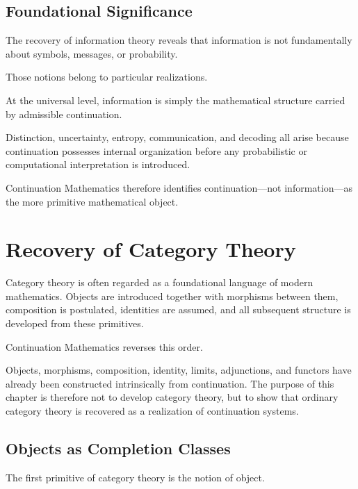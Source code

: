 \documentclass[13pt,openany]{book}
\theoremstyle{plain}
\theoremstyle{definition}
\begin{document}
\section{Foundational Significance}

The recovery of information theory reveals that information is not fundamentally
about symbols, messages, or probability.

Those notions belong to particular realizations.

At the universal level, information is simply the mathematical structure carried
by admissible continuation.

Distinction, uncertainty, entropy, communication, and decoding all arise because
continuation possesses internal organization before any probabilistic or
computational interpretation is introduced.

Continuation Mathematics therefore identifies continuation—not information—as the
more primitive mathematical object.

\chapter{Recovery of Category Theory}

Category theory is often regarded as a foundational language of modern
mathematics. Objects are introduced together with morphisms between them,
composition is postulated, identities are assumed, and all subsequent structure
is developed from these primitives.

Continuation Mathematics reverses this order.

Objects, morphisms, composition, identity, limits, adjunctions, and functors
have already been constructed intrinsically from continuation. The purpose of
this chapter is therefore not to develop category theory, but to show that
ordinary category theory is recovered as a realization of continuation systems.

\section{Objects as Completion Classes}

The first primitive of category theory is the notion of object.
\end{document}
